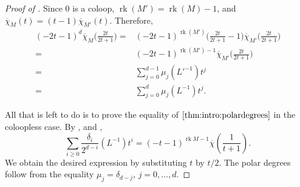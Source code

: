 \documentclass[12pt,a4paper,english]{scrartcl}
\newcommand{\QQ}{\mathbb{Q}}
\newcommand{\PP}{\mathbb{P}}
\DeclareMathOperator{\rank}{rk}
\DeclareMathOperator{\Con}{Con}
\newcommand{\ChowGrp}{\mathrm{A}}
\begin{document}
\begin{proof}[Proof of ]
    Since $0$ is a coloop, $\rank(M') = \rank(M)-1$, and $\overline{\chi}_M(t) = (t-1)\overline{\chi}_{M'}(t)$.
    Therefore,
    \begin{align*}
    (-2t-1)^d\overline{\chi}_{M}\big(\frac{2t}{2t+1}\big) =& (-2t-1)^{\rank(M')}\big(\frac{2t}{2t+1}-1\big)\overline{\chi}_{M'}\big(\frac{2t}{2t+1}\big) \\
    =&(-2t-1)^{\rank(M')-1}\overline{\chi}_{M'}\big(\frac{2t}{2t+1}\big) \\
    =& \sum_{j = 0}^{d-1} \mu_j(L'^{-1})t^j\\
    =& \sum_{j = 0}^d \mu_j(L^{-1})t^j.
    \end{align*}
    
    All that is left to do is to prove the equality of $\Cref{thm:intro:polardegrees}$ in the coloopless case.
    By ,  and ,
    \[
    \sum_{i \geq 0} \frac{\delta_i}{2^{d-i}}(L^{-1})t^i =
    (-t-1)^{\rank M - 1}\overline{\chi}\left(\frac{1}{t+1}\right).
    \]
    We obtain the desired expression by substituting $t$ by $t/2$. The polar degrees follow from the equality $\mu_j = \delta_{d-j}$, $j = 0,\dots, d$.
\end{proof}
\end{document}
